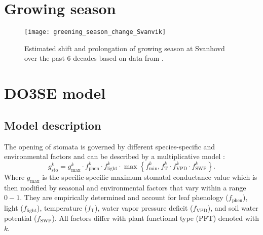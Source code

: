 \documentclass[bg, manuscript]{copernicus}
\begin{document}









\clearpage

\appendix
\section{Growing season}
\label{appendix:growing_season}

\begin{figure*}[th]
  \texttt{[image: greening\_season\_change\_Svanvik]}
  \caption{Estimated shift and prolongation of growing season at Svanhovd over the past 6 decades based on data from \citet{SeNorge}.}
  \label{fig:greening_season_change_Svanvik}
\end{figure*}

\section{DO3SE model}
\label{appendix:do3se_model}

\subsection{Model description}
\label{subsec:model_describtion}
The opening of stomata is governed by different species-specific and environmental factors and can be described by a multiplicative model \citep{PTRS:Jarvis1976,Emberson2000,ICP:MappingManual2017}:
\begin{equation}
  g^k_\text{sto} = g^k_\text{max} \cdot f^k_\text{phen} \cdot f^k_\text{light} \cdot \max{\left\{f^k_\text{min}, f^k_\mathrm{T} \cdot f^k_\mathrm{VPD} \cdot f^k_\text{SWP}\right\}}.
  \label{eq:stomatal}
\end{equation}
%
Where $g_\mathrm{max}$ is the specific-specific maximum stomatal conductance value which is then modified by seasonal and environmental factors that vary within a range $0-1$. They are empirically determined and account for leaf phenology ($f_\text{phen}$), light ($f_\text{light}$), temperature ($f_\mathrm{T}$), water vapor pressure deficit ($f_\mathrm{VPD}$), and soil water potential ($f_\text{SWP}$). All factors differ with plant functional type (PFT) denoted with $k$.
\end{document}
